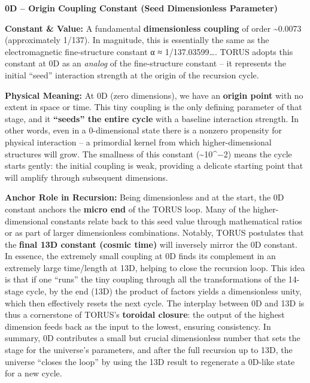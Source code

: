 \documentclass[
]{article}
\begin{document}
\textbf{0D -- Origin Coupling Constant (Seed Dimensionless Parameter)}

\textbf{Constant \& Value:} A fundamental \textbf{dimensionless
coupling} of order \textasciitilde0.0073 (approximately
1/137)\hspace{0pt}. In magnitude, this is essentially the same as the
electromagnetic fine-structure constant α ≈
1/137.03599\ldots\hspace{0pt}. TORUS adopts this constant at 0D as an
\emph{analog} of the fine-structure constant -- it represents the
initial ``seed'' interaction strength at the origin of the recursion
cycle.

\textbf{Physical Meaning:} At 0D (zero dimensions), we have an
\textbf{origin point} with no extent in space or time. This tiny
coupling is the only defining parameter of that stage, and it
\textbf{``seeds'' the entire cycle} with a baseline interaction
strength\hspace{0pt}. In other words, even in a 0-dimensional state
there is a nonzero propensity for physical interaction -- a primordial
kernel from which higher-dimensional structures will grow. The smallness
of this constant (\textasciitilde10\^{}−2) means the cycle starts
gently: the initial coupling is weak, providing a delicate starting
point that will amplify through subsequent dimensions\hspace{0pt}.

\textbf{Anchor Role in Recursion:} Being dimensionless and at the start,
the 0D constant anchors the \textbf{micro end} of the TORUS loop. Many
of the higher-dimensional constants relate back to this seed value
through mathematical ratios or as part of larger dimensionless
combinations. Notably, TORUS postulates that the \textbf{final 13D
constant (cosmic time)} will inversely mirror the 0D
constant\hspace{0pt}. In essence, the extremely small coupling at 0D
finds its complement in an extremely large time/length at 13D, helping
to close the recursion loop. This idea is that if one ``runs'' the tiny
coupling through all the transformations of the 14-stage cycle, by the
end (13D) the product of factors yields a dimensionless unity, which
then effectively resets the next cycle\hspace{0pt}. The interplay
between 0D and 13D is thus a cornerstone of TORUS's \textbf{toroidal
closure}: the output of the highest dimension feeds back as the input to
the lowest, ensuring consistency. In summary, 0D contributes a small but
crucial dimensionless number that sets the stage for the universe's
parameters, and after the full recursion up to 13D, the universe
``closes the loop'' by using the 13D result to regenerate a 0D-like
state for a new cycle\hspace{0pt}.
\end{document}
